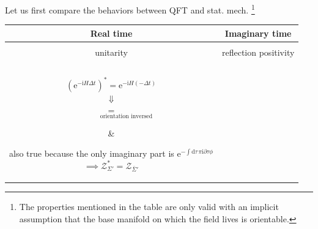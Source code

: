 Let us first compare the behaviors between QFT and stat. mech.
\footnote{
    The properties mentioned in the table are only valid with an implicit assumption that the base manifold on which the field lives is orientable.
}
\begin{center}
    \begin{tabular}{|c|c|}
        \hline
        Real time & Imaginary time\\ 
        \hline & \\
        unitarity & reflection positivity\\ & \\
        \hline & \\
        \parbox{5cm}{\centering
            $\left( \mathrm{e}^{- \mathrm{i} H \Delta t} \right)^{*} = \mathrm{e}^{ - \mathrm{i} H (- \Delta t) }$
            \\
            $\Downarrow$
            \\
            $\mathop{\mathcal{Z}_{\mathbb{R} \times \Sigma}^{*} = \mathcal{Z}_{\mathop{\bar{\mathbb{R}}}\limits^{}_{\uparrow} \times \Sigma}}\limits^{}_{
                \hspace{5em} \text{orientation inversed}
                }
            $
            }&
        
        \parbox{5cm}{\centering
            also true because the only imaginary part is $\mathrm{e}^{- \int \mathrm{d} \tau \, \pi \mathrm{i}  \partial\tau \phi}$
            \\
            $\implies \mathcal{Z}^{*}_{\Sigma'} = \mathcal{Z}_{\bar{\Sigma}'}$
        } \\ & 

        \\ \hline

        \\

        \\
        \\
        \hline & \\


\end{tabular}
\end{center}
